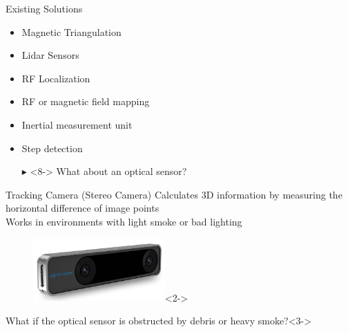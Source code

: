 \documentclass[aspectratio=169,handout]{beamer}
\begin{document}
{	\begin{frame}{Existing Solutions}
		\begin{itemize}
			\item<2-> Magnetic Triangulation %
			\item<3-> Lidar Sensors %
			\item<4-> RF Localization 
			\item<5-> RF or magnetic field mapping%
			\item<6-> Inertial measurement unit %
			\item<7-> Step detection %
			\item[$\blacktriangleright$]<8-> What about an optical sensor?
		\end{itemize}
	\end{frame}
	
	
	\begin{frame}{Tracking Camera (Stereo Camera)}
		 Calculates 3D information by measuring the horizontal difference of image points\\
		 Works in environments with light smoke or bad lighting
	
		
		
		\begin{figure}
			\centering
			\includegraphics[width=0.45\textwidth]{realsense.jpg}<2->
		\end{figure}
		
			\begin{block}{What if the optical sensor is obstructed by debris or heavy smoke?}<3->
		\end{block}
	\end{frame}
	

}
\end{document}

